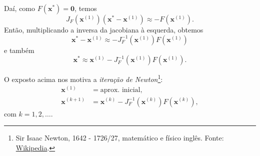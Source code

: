 Daí, como $F(\pmb{x}^*) = \pmb{0}$, temos
\begin{equation}
  J_F(\pmb{x}^{(1)})(\pmb{x}^*-\pmb{x}^{(1)}) \approx -F(\pmb{x}^{(1)}).
\end{equation}
Então, multiplicando a inversa da jacobiana à esquerda, obtemos
\begin{equation}
  \pmb{x}^*-\pmb{x}^{(1)} \approx - J_F^{-1}(\pmb{x}^{(1)})F(\pmb{x}^{(1)})
\end{equation}
e também
\begin{equation}
  \pmb{x}^* \approx \pmb{x}^{(1)} - J_F^{-1}(\pmb{x}^{(1)})F(\pmb{x}^{(1)}).
\end{equation}

O exposto acima nos motiva a \emph{iteração de Newton}\footnote{Sir Isaac Newton, 1642 - 1726/27, matemático e físico inglês. Fonte: \href{https://en.wikipedia.org/wiki/Isaac_Newton}{Wikipedia}.}:
\begin{align}
  \pmb{x}^{(1)} &= \text{aprox. inicial},\\
  \pmb{x}^{(k+1)} &= \pmb{x}^{(k)} - J_F^{-1}(\pmb{x}^{(k)})F(\pmb{x}^{(k)}),
\end{align}
com $k=1, 2, \ldots$.

